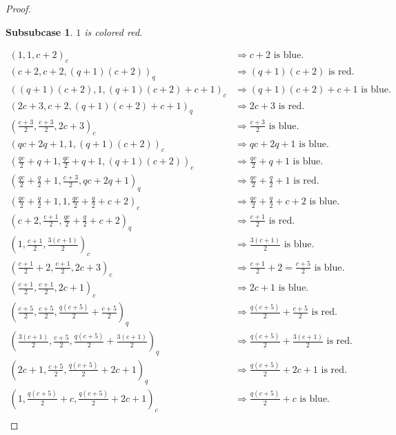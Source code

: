 \documentclass[10pt,a4paper]{amsart}
\newtheorem{subsubcase}{Subsubcase}
\begin{document}
\begin{proof}

\begin{subsubcase}
    $1$ is colored red.
\end{subsubcase}

\begin{align*}
(1,1,c+2)_c&\Longrightarrow c+2 \text{ is blue.}\\
(c+2,c+2,(q+1)(c+2))_q&\Longrightarrow (q+1)(c+2) \text{ is red.}\\
((q+1)(c+2),1, (q+1)(c+2)+c+1 )_c&\Longrightarrow (q+1)(c+2)+c+1 \text{ is blue.}\\
(2c+3,c+2,(q+1)(c+2)+c+1)_q&\Longrightarrow 2c+3 \text{ is red.}\\
\left(\tfrac{c+3}{2},\tfrac{c+3}{2},2c+3\right)_c&\Longrightarrow \tfrac{c+3}{2} \text{ is blue.}\\
(qc+2q+1,1,(q+1)(c+2))_c&\Longrightarrow qc+2q+1 \text{ is blue.}\\
\left(\tfrac{qc}{2}+q+1,\tfrac{qc}{2}+q+1,(q+1)(c+2)\right)_c&\Longrightarrow \tfrac{qc}{2}+q+1 \text{ is blue.}\\
(\tfrac{qc}{2}+\tfrac{q}{2}+1,\tfrac{c+3}{2},qc+2q+1)_q&\Longrightarrow \tfrac{qc}{2}+\tfrac{q}{2}+1 \text{ is red.}\\
(\tfrac{qc}{2}+\tfrac{q}{2}+1,1,\tfrac{qc}{2}+\tfrac{q}{2}+c+2)_c&\Longrightarrow \tfrac{qc}{2}+\tfrac{q}{2}+c+2 \text{ is blue.}\\
(c+2,\tfrac{c+1}{2},\tfrac{qc}{2}+\tfrac{q}{2}+c+2)_q&\Longrightarrow \tfrac{c+1}{2} \text{ is red.}\\
(1,\tfrac{c+1}{2},\tfrac{3(c+1)}{2})_c&\Longrightarrow \tfrac{3(c+1)}{2} \text{ is blue.}\\
(\tfrac{c+1}{2}+2,\tfrac{c+1}{2},2c+3)_c&\Longrightarrow \tfrac{c+1}{2}+2=\tfrac{c+5}{2} \text{ is blue.}\\
(\tfrac{c+1}{2},\tfrac{c+1}{2},2c+1)_c&\Longrightarrow 2c+1 \text{ is blue.}\\
(\tfrac{c+5}{2},\tfrac{c+5}{2},\tfrac{q(c+5)}{2}+\tfrac{c+5}{2})_q&\Longrightarrow \tfrac{q(c+5)}{2}+\tfrac{c+5}{2} \text{ is red.}\\
(\tfrac{3(c+1)}{2},\tfrac{c+5}{2},\tfrac{q(c+5)}{2}+\tfrac{3(c+1)}{2})_q&\Longrightarrow \tfrac{q(c+5)}{2}+\tfrac{3(c+1)}{2} \text{ is red.}\\
(2c+1,\tfrac{c+5}{2},\tfrac{q(c+5)}{2}+2c+1)_q&\Longrightarrow \tfrac{q(c+5)}{2}+2c+1 \text{ is red.}\\
(1,\tfrac{q(c+5)}{2}+c,\tfrac{q(c+5)}{2}+2c+1)_c&\Longrightarrow \tfrac{q(c+5)}{2}+c \text{ is blue.}\\

\end{align*}
\end{proof}
\end{document}

